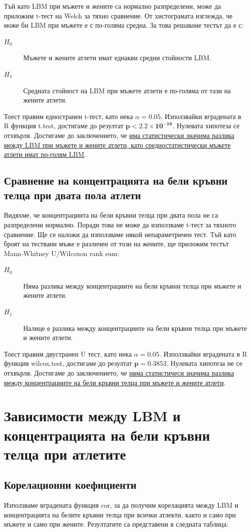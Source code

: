 \documentclass[12pt]{article}
\begin{document}
\begin{large}
Тъй като LBM при мъжете и жените са нормално разпределени, може да приложим t-тест на Welch за тяхно сравнение. От хистограмата изглежда, че може би LBM при мъжете е с по-голяма средна. За това решаваме тестът да е с:
\begin{description}
\item[$H_0$] Мъжете и жените атлети имат еднакви средни стойности LBM. 
\item[$H_1$] Средната стойност на LBM при мъжете атлети е по-голяма от тази на жените атлети.
\end{description}
Тоест правим едностранен t-тест, като нека $\alpha=0.05$. Използвайки вградената в R функция t.test, достигаме до резултат $\mathbf{p<2.2 \times 10^{-16}}$. Нулевата хипотеза се отхвърля. Достигаме до заключението, че \uline{има статистически значима разлика между LBM при мъжете и жените атлети, като средностатистически мъжете атлети имат по-голям LBM}.

\subsection{Сравнение на концентрацията на бели кръвни телца при двата пола атлети}
Видяхме, че концентрациита на бели кръвни телца при двата пола не 
са разпределени нормално. Поради това не може да използваме t-тест за 
тяхното сравнение. Ще се наложи да използваме някой непараметричен 
тест. Тъй като броят на тествани мъже е различен от този на жените, ще 
приложим тестът Mann-Whitney U/Wilcoxon rank sum:
\begin{description}
\item[$H_0$] Няма разлика между концентрациите на бели кръвни телца при мъжете и жените атлети. 
\item[$H_1$] Налице е разлика между концентрациите на бели кръвни телца при мъжете и жените атлети.
\end{description}
Тоест правим двустранен U тест, като нека $\alpha=0.05$. Използвайки 
вградената в R функция wilcox.test, достигаме до резултат $\mathbf{p=0.3853}$. 
Нулевата хипотеза не се отхвърля. Достигаме до заключението, че \uline{няма статистичеси значима разлика между концентрациите на бели кръвни телца при мъжете и жените атлети}.


\section{Зависимости между LBM и концентрацията на бели кръвни телца при атлетите}

\subsection{Корелационни коефициенти}
Използваме вградената функция cor, за да получим корелацията 
между LBM и концентрацията на белите кръвни телца при всички атлекти, както и само при мъжете и само при жените. Резултатите са представени в следната таблица:


\end{large}
\end{document}
